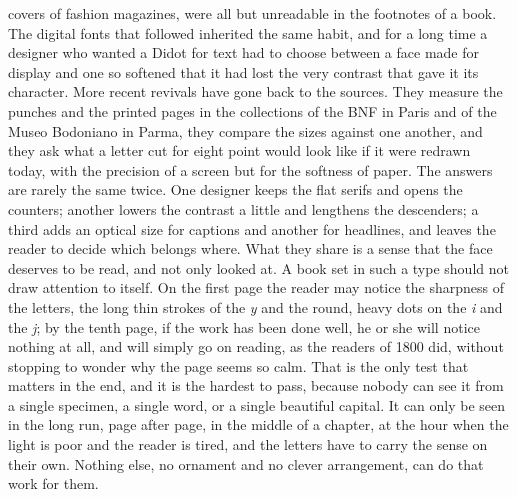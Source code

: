 \documentclass[10.5pt]{article}
\newcommand\allsc[1]{{\addfontfeature{Letters={SmallCaps,UppercaseSmallCaps}}#1}}
\begin{document}
covers of fashion magazines, were all but unreadable in the footnotes of a
book. The digital fonts that followed inherited the same habit, and for a long
time a designer who wanted a Didot for text had to choose between a face made
for display and one so softened that it had lost the very contrast that gave
it its character. More recent revivals have gone back to the sources. They
measure the punches and the printed pages in the collections of the
\allsc{BNF} in Paris and of the Museo Bodoniano in Parma, they compare the
sizes against one another, and they ask what a letter cut for eight point
would look like if it were redrawn today, with the precision of a screen but
for the softness of paper. The answers are rarely the same twice. One
designer keeps the flat serifs and opens the counters; another lowers the
contrast a little and lengthens the descenders; a third adds an optical size
for captions and another for headlines, and leaves the reader to decide which
belongs where. What they share is a sense that the face deserves to be read,
and not only looked at. A book set in such a type should not draw attention
to itself. On the first page the reader may notice the sharpness of the
letters, the long thin strokes of the \emph{y} and the round, heavy dots on
the \emph{i} and the \emph{j}; by the tenth page, if the work has been done
well, he or she will notice nothing at all, and will simply go on reading, as
the readers of 1800 did, without stopping to wonder why the page seems so
calm. That is the only test that matters in the end, and it is the hardest to
pass, because nobody can see it from a single specimen, a single word, or a
single beautiful capital. It can only be seen in the long run, page after
page, in the middle of a chapter, at the hour when the light is poor and the
reader is tired, and the letters have to carry the sense on their own. Nothing else, no ornament
and no clever arrangement, can do that work for them.
\newpage
\end{document}
